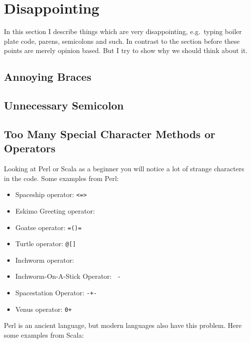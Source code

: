 \documentclass[12pt,a4paper]{report}
\begin{document}
\section{Disappointing}

In this section I describe things which are very disappointing, e.g.\ typing boiler plate code, parens, semicolons and such. In contrast to the section before these points are merely opinion based. But I try to show why we should think about it.

\subsection{Annoying Braces}


\subsection{Unnecessary Semicolon}


\subsection{Too Many Special Character Methods or Operators}

Looking at Perl or Scala as a beginner you will notice a lot of strange characters in the code. Some examples from Perl\cite{secret-perl-operators}:

\begin{itemize}
    \item Spaceship operator: \texttt{<=>}
    \item Eskimo Greeting operator: \texttt{}{}
    \item Goatse operator: \texttt{=()=}
    \item Turtle operator: \texttt{@{[]}}
    \item Inchworm operator: \texttt{~~}
    \item Inchworm-On-A-Stick Operator: \texttt{~-}
    \item Spacestation Operator: \texttt{-+-}
    \item Venus operator: \texttt{0+}
\end{itemize}

Perl is an ancient language, but modern languages also have this problem. Here some examples from Scala\cite{special-operators-scala}:
\end{document}
